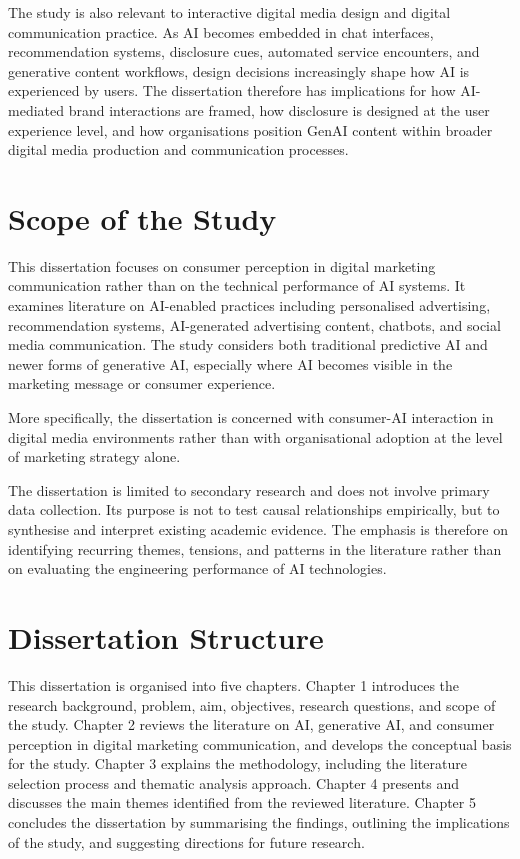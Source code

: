 The study is also relevant to interactive digital media design and digital communication practice. As AI becomes embedded in chat interfaces, recommendation systems, disclosure cues, automated service encounters, and generative content workflows, design decisions increasingly shape how AI is experienced by users. The dissertation therefore has implications for how AI-mediated brand interactions are framed, how disclosure is designed at the user experience level, and how organisations position GenAI content within broader digital media production and communication processes.

\section{Scope of the Study}
This dissertation focuses on consumer perception in digital marketing communication rather than on the technical performance of AI systems. It examines literature on AI-enabled practices including personalised advertising, recommendation systems, AI-generated advertising content, chatbots, and social media communication. The study considers both traditional predictive AI and newer forms of generative AI, especially where AI becomes visible in the marketing message or consumer experience.

More specifically, the dissertation is concerned with consumer-AI interaction in digital media environments rather than with organisational adoption at the level of marketing strategy alone.

The dissertation is limited to secondary research and does not involve primary data collection. Its purpose is not to test causal relationships empirically, but to synthesise and interpret existing academic evidence. The emphasis is therefore on identifying recurring themes, tensions, and patterns in the literature rather than on evaluating the engineering performance of AI technologies.

\section{Dissertation Structure}
This dissertation is organised into five chapters. Chapter 1 introduces the research background, problem, aim, objectives, research questions, and scope of the study. Chapter 2 reviews the literature on AI, generative AI, and consumer perception in digital marketing communication, and develops the conceptual basis for the study. Chapter 3 explains the methodology, including the literature selection process and thematic analysis approach. Chapter 4 presents and discusses the main themes identified from the reviewed literature. Chapter 5 concludes the dissertation by summarising the findings, outlining the implications of the study, and suggesting directions for future research.
